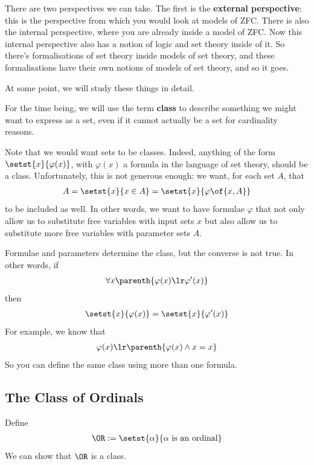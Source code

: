 There are two perspectives we can take. The first is the \textbf{external perspective}: this is the perspective from which you would look at models of ZFC. There is also the internal perspective, where you are already inside a model of ZFC. Now this internal perspective also has a notion of logic and set theory inside of it. So there's formalisations of set theory inside models of set theory, and these formalisations have their own notions of models of set theory, and so it goes.

At some point, we will study these things in detail.

For the time being, we will use the term \textbf{class} to describe something we might want to express as a set, even if it cannot actually be a set for cardinality reasons.

Note that we would want sets to be classes. Indeed, anything of the form $\setst{x}{\varphi(x)}$, with $\varphi(x)$ a formula in the language of set theory, should be a class. Unfortunately, this is not generous enough: we want, for each set $A$, that
\begin{align*}
    A = \setst{x}{x \in A} = \setst{x}{\varphi\of{x, A}}
\end{align*}
to be included as well. In other words, we want to have formulae $\varphi$ that not only allow us to substitute free variables with input sets $x$ but also allow us to substitute more free variables with parameter sets $A$.

Formulae and parameters determine the class, but the converse is not true. In other words, if
\begin{align*}
    \forall x \parenth{\varphi(x) \lr \varphi'(x)}
\end{align*}
then
\begin{align*}
    \setst{x}{\varphi(x)} = \setst{x}{\varphi'(x)}
\end{align*}
For example, we know that
\begin{align*}
    \varphi(x) \lr \parenth{\varphi(x) \land x = x}
\end{align*}
So you can define the same class using more than one formula.

\subsection{The Class of Ordinals}

\begin{boxdefinition}
    Define
    \begin{align*}
        \OR := \setst{\alpha}{\alpha \text{ is an ordinal}}
    \end{align*}
    We can show that $\OR$ is a class.
\end{boxdefinition}

